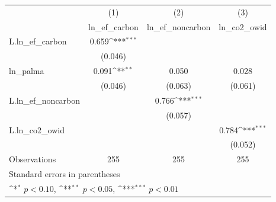 {
\def\sym#1{\ifmmode^{#1}\else\(^{#1}\)\fi}
\begin{tabular}{l*{3}{c}}
\hline\hline
                    &\multicolumn{1}{c}{(1)}&\multicolumn{1}{c}{(2)}&\multicolumn{1}{c}{(3)}\\
                    &\multicolumn{1}{c}{ln\_ef\_carbon}&\multicolumn{1}{c}{ln\_ef\_noncarbon}&\multicolumn{1}{c}{ln\_co2\_owid}\\
\hline
L.ln\_ef\_carbon      &       0.659\sym{***}&                     &                     \\
                    &     (0.046)         &                     &                     \\
[1em]
ln\_palma            &       0.091\sym{**} &       0.050         &       0.028         \\
                    &     (0.046)         &     (0.063)         &     (0.061)         \\
[1em]
L.ln\_ef\_noncarbon   &                     &       0.766\sym{***}&                     \\
                    &                     &     (0.057)         &                     \\
[1em]
L.ln\_co2\_owid       &                     &                     &       0.784\sym{***}\\
                    &                     &                     &     (0.052)         \\
\hline
Observations        &         255         &         255         &         255         \\
\hline\hline
\multicolumn{4}{l}{\footnotesize Standard errors in parentheses}\\
\multicolumn{4}{l}{\footnotesize \sym{*} \(p<0.10\), \sym{**} \(p<0.05\), \sym{***} \(p<0.01\)}\\
\end{tabular}
}

